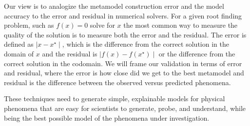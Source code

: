 \documentclass{article}
\begin{document}
Our view is to analogize the metamodel construction error and the model accuracy to the error and residual in numerical solvers.
For a given root finding problem, such as $f(x)=0$ solve for $x$ the most common way to measure the quality of the solution is to measure both the error and the residual.
The error is defined as $\mid x-x^\star\mid$, which is the difference from the correct solution in the domain of $x$ and the residual is $\mid f(x) - f(x^\star)\mid$ or the difference from the correct solution in the codomain. 
We will frame our validation in terms of error and residual, where the error is how close did we get to the best metamodel and residual is the difference between the observed versus predicted phenomena.

These techniques need to generate simple, explainable models for physical phenomena that are easy for scientists to generate, probe, and understand, while being the best possible model of the phenomena under investigation. 





\end{document}
